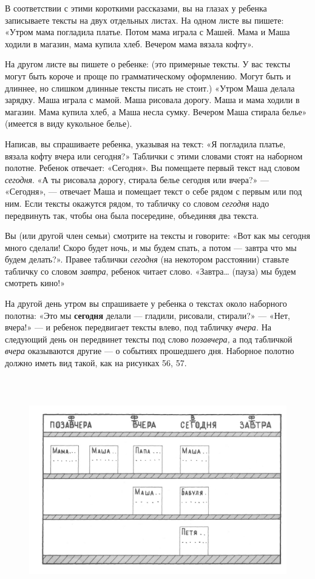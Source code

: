 \documentclass[a5paper]{book}
\renewcommand{\emph}[1]{\textit{#1}}
\begin{document}
В соответствии с этими короткими рассказами, вы на глазах у ребенка
записываете тексты на двух отдельных листах. На одном листе вы пишете:
«Утром мама погладила платье. Потом мама играла с Машей. Мама и Маша
ходили в магазин, мама купила хлеб. Вечером мама вязала кофту».

На другом листе вы пишете о ребенке: (это примерные тексты. У вас тексты
могут быть короче и проще по грамматическому оформлению. Могут быть и
длиннее, но слишком длинные тексты писать не стоит.) «Утром Маша делала
зарядку. Маша играла с мамой. Маша рисовала дорогу. Маша и мама ходили в
магазин. Мама купила хлеб, а Маша несла сумку. Вечером Маша стирала
белье» (имеется в виду кукольное белье).

Написав, вы спрашиваете ребенка, указывая на текст: «Я погладила платье,
вязала кофту вчера или сегодня?» Таблички с этими словами стоят на
наборном полотне. Ребенок отвечает: «Сегодня». Вы помещаете первый текст
над словом \emph{сегодня}. «А ты рисовала дорогу, стирала белье сегодня
или вчера?» --- «Сегодня», --- отвечает Маша и помещает текст о себе
рядом с первым или под ним. Если тексты окажутся рядом, то табличку со
словом \emph{сегодня} надо передвинуть так, чтобы она была посередине,
объединяя два текста.

Вы (или другой член семьи) смотрите на тексты и говорите: «Вот как мы
сегодня много сделали! Скоро будет ночь, и мы будем спать, а потом ---
завтра что мы будем делать?». Правее таблички \emph{сегодня} (на
некотором расстоянии) ставьте табличку со словом \emph{завтра}, ребенок
читает слово. «Завтра\ldots{} (пауза) мы будем смотреть кино!»

На другой день утром вы спрашиваете у ребенка о текстах около наборного
полотна: «Это мы \textbf{сегодня} делали --- гладили, рисовали,
стирали?» --- «Нет, вчера!» --- и ребенок передвигает тексты влево, под
табличку \emph{вчера.} На следующий день он передвинет тексты под слово
\emph{позавчера,} а под табличкой \emph{вчера} оказываются другие --- о
событиях прошедшего дня. Наборное полотно должно иметь вид такой, как на
рисунках 56, 57.

\begin{figure}
\centering
\includegraphics[width=5.87236in,height=3.85765in]{media/media/image53.jpg}
\end{figure}
\end{document}
